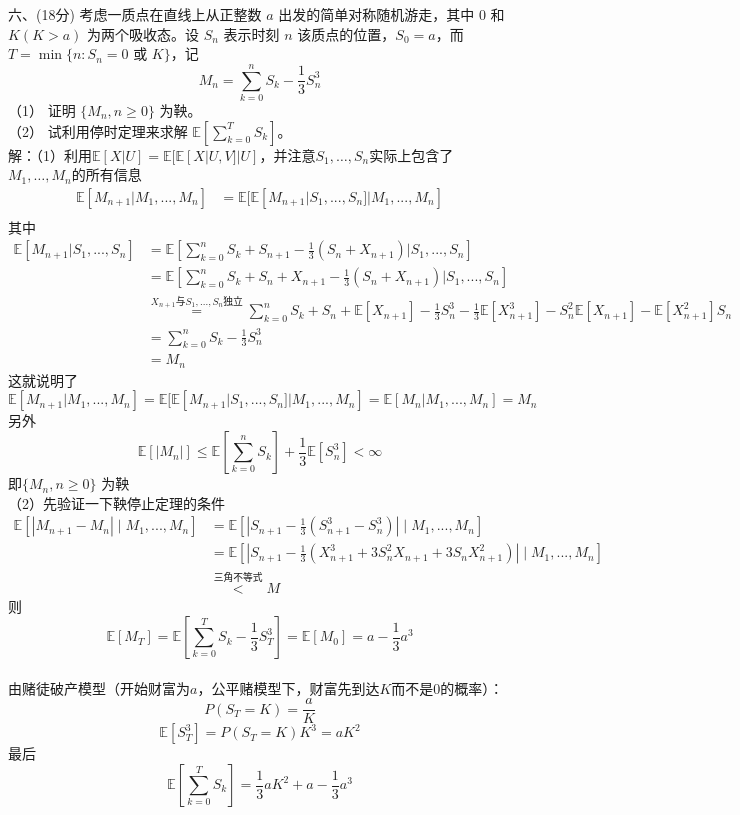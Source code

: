 \documentclass[UTF8]{ctexart}
\begin{document}
\noindent 六、(18分) 考虑一质点在直线上从正整数 $a$ 出发的简单对称随机游走，其中 $0$ 和 $K(K > a)$ 为两个吸收态。设 $S_n$ 表示时刻 $n$ 该质点的位置，$S_0 = a$，而 $T = \min\{n : S_n = 0 \text{ 或 } K\}$，记
\[
M_n = \sum_{k=0}^n S_k - \frac{1}{3} S_n^3
\]
（1） 证明 $\{M_n, n \geq 0\}$ 为鞅。\\
（2） 试利用停时定理来求解 $\mathbb{E}[\sum_{k=0}^TS_k]$。\\
解：（1）利用$\mathbb{E}[X|U]=\mathbb{E}[\mathbb{E}[X|U,V]|U]$，并注意$S_1,\dots,S_n$实际上包含了$M_1,\dots,M_n$的所有信息\\
$$
\begin{aligned}
	\mathbb{E}[M_{n+1}|M_1,...,M_n] &= \mathbb{E}[\mathbb{E}[M_{n+1}|S_1,...,S_n]|M_1,...,M_n] \\
\end{aligned}
$$
其中
$$
\begin{aligned}
	\mathbb{E}[M_{n+1}|S_1,...,S_n] & =\mathbb{E}\left[\sum\limits_{k=0}^{n} S_k +S_{n+1}-\frac{1}{3}\left( S_n+X_{n+1}\right) |S_1,...,S_n\right] \\
	&=\mathbb{E}\left[\sum\limits_{k=0}^{n} S_k +S_{n}+X_{n+1}-\frac{1}{3}\left( S_n+X_{n+1}\right)|S_1,...,S_n \right]\\
	 & \stackrel{X_{n+1}\text{与}S_1,...,S_n\text{独立}}=\sum\limits_{k=0}^{n} S_k+S_n+\mathbb{E}[X_{n+1}]-\frac{1}{3}S_n^3-\frac{1}{3}\mathbb{E}[X_{n+1}^3]-S_n^2\mathbb{E}[X_{n+1}]-\mathbb{E}[X_{n+1}^2]S_n\\
	 &=\sum_{k=0}^n S_k - \frac{1}{3} S_n^3\\
	 &=M_n
\end{aligned}
$$
这就说明了
\[
	\mathbb{E}[M_{n+1}|M_1,...,M_n]=\mathbb{E}[\mathbb{E}[M_{n+1}|S_1,...,S_n]|M_1,...,M_n]=\mathbb{E}[M_n|M_1,...,M_n]=M_n
\]
另外
\[
\mathbb{E}[|M_n|]\le \mathbb{E}\left[\sum_{k=0}^n S_k  \right] +\frac{1}{3}\mathbb{E}[S_n^3] < \infty
\]
即$\{M_n, n \geq 0\}$ 为鞅\\
（2）先验证一下鞅停止定理的条件
$$
\begin{aligned}
	\mathbb{E}[|M_{n+1}-M_n|\mid M_1,...,M_n] & =\mathbb{E}\left[|S_{n+1}-\frac{1}{3}(S_{n+1}^3-S_n^3)|\mid M_1,...,M_n\right] \\
	 &   =\mathbb{E}\left[|S_{n+1}-\frac{1}{3}(X_{n+1}^3+3S_n^2X_{n+1}+3S_nX_{n+1}^2)|\mid M_1,...,M_n\right] \\
	 &\stackrel{\text{三角不等式}}<M
\end{aligned}
$$
则$$\mathbb{E}[M_T]=\mathbb{E}\left[ \sum_{k=0}^T S_k - \frac{1}{3} S_T^3\right] =\mathbb{E}[M_0]=a-\frac{1}{3}a^3$$\\
由赌徒破产模型（开始财富为$a$，公平赌模型下，财富先到达$K$而不是0的概率）：
\[
P(S_T=K)=\frac{a}{K}
\]
\[
\mathbb{E}\left[S_T^3 \right] =P(S_T=K)K^3=aK^2
\]
最后
\[
\mathbb{E}\left[ \sum_{k=0}^TS_k\right] =\frac{1}{3}aK^2+a-\frac{1}{3}a^3
\]\\
\end{document}
